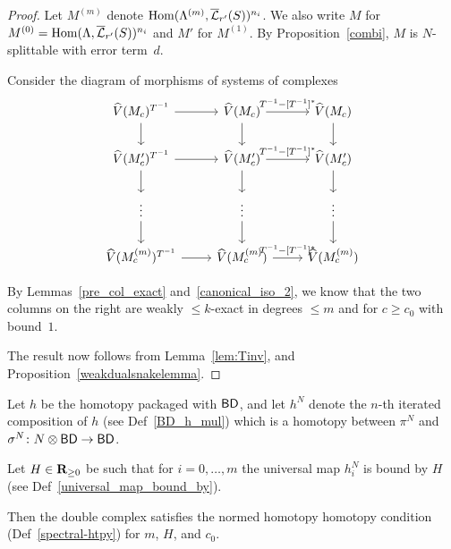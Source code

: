 \begin{proof}\leanok
  Let $M^{(m)}$ denote $\operatorname{Hom}(\Lambda^{(m)},\overline{\mathcal L}_{r'}(S))^{n_i}$.
  We also write $M$ for $M^{(0)} = \operatorname{Hom}(\Lambda,\overline{\mathcal L}_{r'}(S))^{n_i}$
  and $M'$ for $M^{(1)}$.
  By Proposition~\ref{combi}, $M$ is $N$-splittable with error term~$d$.

  Consider the diagram of morphisms of systems of complexes
  \[
    \begin{tikzcd}
      \hat V(M_c)^{T^{-1}} \rar\dar & \hat V(M_c) \rar["{T^{-1} - [T^{-1}]^*}"]\dar & \hat V(M_c) \dar \\
      \hat V(M'_c)^{T^{-1}} \rar\dar & \hat V(M'_c) \rar["{T^{-1} - [T^{-1}]^*}"]\dar & \hat V(M'_c) \dar \\
      \vdots \dar & \vdots \dar & \vdots \dar \\
      \hat V(M^{(m)}_c)^{T^{-1}} \rar & \hat V(M^{(m)}_c) \rar["{T^{-1} - [T^{-1}]^*}"] & \hat V(M^{(m)}_c)
    \end{tikzcd}
  \]

  By Lemmas~\ref{pre_col_exact} and~\ref{canonical_iso_2},
  we know that the two columns on the right are
  weakly $\le k$-exact in degrees $\le m$ and for $c \ge c_0$ with bound~$1$.

  The result now follows from Lemma~\ref{lem:Tinv}, and Proposition~\ref{weakdualsnakelemma}.
\end{proof}

\begin{proposition}
  \label{double-complex-htpy}
  \leanok
  Let $h$ be the homotopy packaged with $\mathsf{BD}$,
  and let $h^N$ denote the $n$-th iterated composition of $h$
  (see Def~\ref{BD_h_mul})
  which is a homotopy between
  $\pi^N$ and $\sigma^N \colon N \otimes \mathsf{BD} \to \mathsf{BD}$.

  Let $H \in \mathbf{R}_{\ge 0}$ be such that for $i = 0, \dots, m$
  the universal map $h^N_i$ is bound by $H$
  (see Def~\ref{universal_map_bound_by}).

  Then the double complex satisfies
  the normed homotopy homotopy condition (Def~\ref{spectral-htpy})
  for $m$, $H$, and $c_0$.
\end{proposition}

